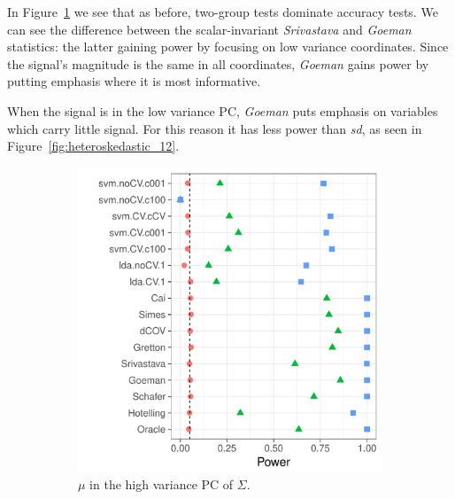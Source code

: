 \documentclass[onecolumn,draftclsnofoot]{IEEEtran}
\begin{document}
In Figure~\ref{fig:heteroskedastic_11} we see that as before, two-group tests dominate accuracy tests.	
We can see the difference between the scalar-invariant \emph{Srivastava} and \emph{Goeman} statistics: the latter gaining power by focusing on low variance coordinates. 
Since the signal's magnitude is the same in all coordinates, \emph{Goeman} gains power by putting emphasis where it is most informative.

When the signal is in the low variance PC, \emph{Goeman} puts emphasis on variables which carry little signal.
For this reason it has less power than \emph{sd}, as seen in Figure~\ref{fig:heteroskedastic_12}.

\begin{figure}[h]
	\centering
	\caption{Heteroskedasticity: $\Sigma$ is diagonal with $\Sigma_{jj}=j$.}	
	\label{fig:heteroskedastic}	
	\begin{subfigure}[t]{.45\columnwidth}
		\centering
		\includegraphics[width=1\columnwidth]{"art/file26"}
		\caption{$\mu$ in the high variance PC of $\Sigma$.}  
		\label{fig:heteroskedastic_11}	
	\end{subfigure}
	\begin{subfigure}[t]{0.45\columnwidth}
		\centering

\end{subfigure}
\end{figure}
\end{document}
